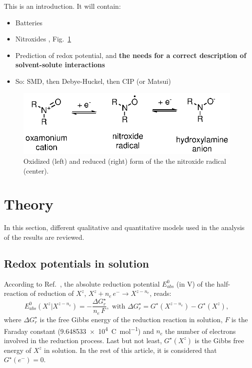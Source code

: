 \documentclass[review]{elsarticle}
\begin{document}
This is an introduction. It will contain:\begin{itemize}
	\item Batteries
	\item Nitroxides \cite{souleChemistryBiologyNitroxide2007}, Fig.~\ref{fig:states} 
	\item Prediction of redox potential, and \textbf{the needs for a correct description of solvent-solute interactions}
	\item So: SMD, then Debye-Huckel, then CIP (or Matsui)
\end{itemize}

\begin{figure}[!h]
	\centering
	\includegraphics[width=.5\linewidth]{Figure1}
	\caption{Oxidized (left) and reduced (right) form of the the nitroxide radical (center).}
	\label{fig:states}
\end{figure}

\section{Theory}

In this section, different qualitative and quantitative models used in the analysis of the results are reviewed.

\subsection{Redox potentials in solution}

According to Ref.~\cite{marenichComputationalElectrochemistryPrediction2014}, the absolute reduction potential $E_{abs}^0$ (in \si{\volt}) of the half-reaction of reduction of $X^z$, $X^{z} + n_e\,e^- \rightarrow X^{z-n_e}$, reads: \begin{equation}
	E_{abs}^0(X^{z}|X^{z-n_e}) = -\frac{\Delta G_{r}^\star}{n_e\,F}, \text{ with } \Delta G_{r}^\star = G^\star(X^{z-n_e}) - G^\star(X^z), \label{eq:nernst}
\end{equation}
where $\Delta G_{r}^\star$ is the free Gibbs energy of the reduction reaction in solution, $F$ is the Faraday constant (\SI{9.648533e4}{\coulomb\per\mole}) and $n_e$ the number of electrons involved in the reduction process. Last but not least, $G^\star(X^z)$ is the Gibbs free energy of $X^z$ in solution.  In the rest of this article, it is considered that $G^\star(e^-) = 0$.
\end{document}
